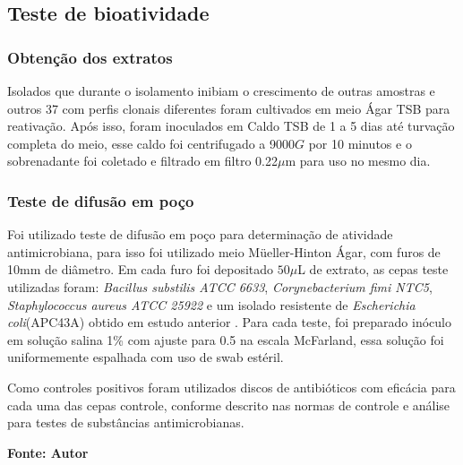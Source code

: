 \subsection{Teste de bioatividade}
\subsubsection{Obtenção dos extratos}
Isolados que durante o isolamento inibiam o crescimento de outras amostras e outros 37
com perfis clonais diferentes foram cultivados em meio Ágar TSB para
reativação. Após isso, foram inoculados em Caldo TSB de 1 a 5 dias até turvação completa
do meio, esse caldo foi centrifugado a 9000$G$ por 10 minutos e o sobrenadante foi coletado
e filtrado em filtro 0.22$\mu$m para uso no mesmo dia.
\subsubsection{Teste de difusão em poço}
Foi utilizado teste de difusão em poço para determinação de atividade antimicrobiana,
para isso foi utilizado meio Müeller-Hinton Ágar, com furos de 10mm de diâmetro.
Em cada furo foi depositado $50\mu$L de extrato, as cepas teste utilizadas foram:
\textit{Bacillus substilis ATCC 6633}, \textit{Corynebacterium fimi NTC5}, \textit{Staphylococcus aureus ATCC 25922}
e um isolado resistente de \textit{Escherichia coli}(APC43A) obtido em estudo anterior \cite{dhara2019}.
Para cada teste, foi preparado inóculo em solução salina 1\% com ajuste para 0.5
na escala McFarland, essa solução foi uniformemente espalhada com uso de swab estéril.

Como controles positivos foram utilizados discos de antibióticos com
eficácia para cada uma das cepas controle, conforme descrito nas normas de controle e
análise para testes de substâncias antimicrobianas\cite{clsi2020}.

\begin{table}
    \caption{Antibióticos utilizados como controle}
    \label{tab:lista_antibioticos}
    \tiny
    \centering
    \begin{small}\textbf{Fonte: Autor}\end{small}
\end{table}


